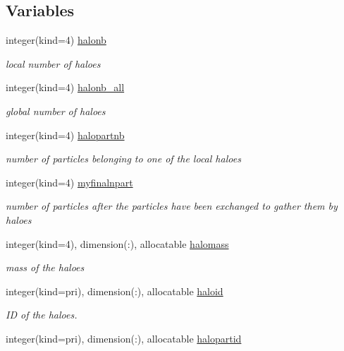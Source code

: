 \subsection*{Variables}
\begin{DoxyCompactItemize}
\item 
integer(kind=4) \hyperlink{namespacemodhalo_a7a64076c8448a822872da06cfb3e98f6}{halonb}
\begin{DoxyCompactList}\small\item\em local number of haloes \end{DoxyCompactList}\item 
integer(kind=4) \hyperlink{namespacemodhalo_a8e5ab9d4d7316b9c26af34ac45a088ef}{halonb\+\_\+all}
\begin{DoxyCompactList}\small\item\em global number of haloes \end{DoxyCompactList}\item 
integer(kind=4) \hyperlink{namespacemodhalo_a026b99d5d7dc52fa2755b516c9947514}{halopartnb}
\begin{DoxyCompactList}\small\item\em number of particles belonging to one of the local haloes \end{DoxyCompactList}\item 
integer(kind=4) \hyperlink{namespacemodhalo_a52f1f25dcc26f652f137e54813e02309}{myfinalnpart}
\begin{DoxyCompactList}\small\item\em number of particles after the particles have been exchanged to gather them by haloes \end{DoxyCompactList}\item 
integer(kind=4), dimension(\+:), allocatable \hyperlink{namespacemodhalo_a22da1dc93c68210ac3c692f1fb545bc0}{halomass}
\begin{DoxyCompactList}\small\item\em mass of the haloes \end{DoxyCompactList}\item 
integer(kind=pri), dimension(\+:), allocatable \hyperlink{namespacemodhalo_a28d1d14569d3cd370d375aca76fd838c}{haloid}
\begin{DoxyCompactList}\small\item\em ID of the haloes. \end{DoxyCompactList}\item 
integer(kind=pri), dimension(\+:), allocatable \hyperlink{namespacemodhalo_a6c47abc5102dc629247c7b90831b1030}{halopartid}

\end{DoxyCompactItemize}
